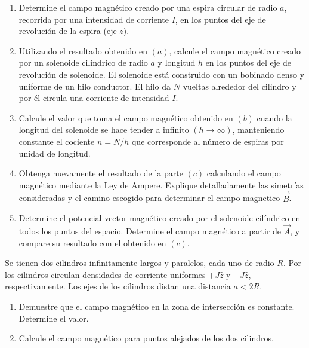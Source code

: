 \np
\begin{enumerate}[label=\alph*)]
	\item Determine el campo magnético creado por una espira circular de radio $a$, recorrida por una intensidad de corriente $I$, en los puntos del eje de revolución de la espira (eje $z$).

	\item Utilizando el resultado obtenido en $(a)$, calcule el campo magnético creado por un solenoide cilíndrico de radio $a$ y longitud $h$ en los puntos del eje de revolución de solenoide. El solenoide está construido con un bobinado denso y uniforme de un hilo conductor. El hilo da $N$ vueltas alrededor del cilindro y por él circula una corriente de intensidad $I$.

	\item Calcule el valor que toma el campo magnético obtenido en $(b)$ cuando la longitud del solenoide se hace tender a inﬁnito $(h \to \infty)$, manteniendo constante el cociente $n = N/h$ que corresponde al número de espiras por unidad de longitud.

	\item Obtenga nuevamente el resultado de la parte $(c)$ calculando el campo magnético mediante la Ley de Ampere. Explique detalladamente las simetrías consideradas y el camino escogido para determinar el campo magnetico $\vec{B}$.	

	\item Determine el potencial vector magnético creado por el solenoide cilíndrico en todos los puntos del espacio. Determine el campo magnético a partir de $\vec{A}$, y compare su resultado con el obtenido en $(c)$.

\end{enumerate}


\pagebreak

\np
Se tienen dos cilindros inﬁnitamente largos y paralelos, cada uno de radio $R$. Por los cilindros circulan densidades de corriente uniformes $+J \hat{z}$ y $-J \hat{z}$, respectivamente. Los ejes de los cilindros distan una distancia $a < 2R$.

\begin{enumerate}[label=\alph*)]
	\item Demuestre que el campo magnético en la zona de intersección es constante. Determine el valor.

	\item Calcule el campo magnético para puntos alejados de los dos cilindros.
\end{enumerate}

